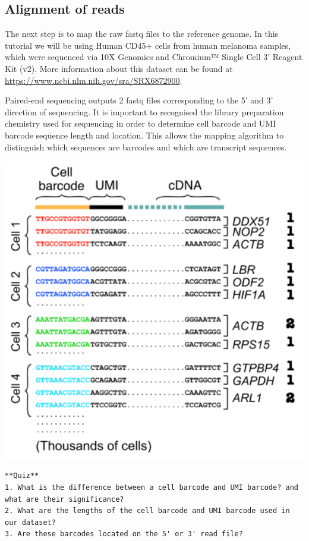 \documentclass[]{book}
\begin{document}
\hypertarget{alignment-of-reads}{%
\subsection{Alignment of reads}\label{alignment-of-reads}}

The next step is to map the raw fastq files to the reference genome. In this tutorial we will be using Human CD45+ cells from human melanoma samples, which were sequenced via 10X Genomics and Chromium™ Single Cell 3' Reagent Kit (v2). More information about this dataset can be found at \url{https://www.ncbi.nlm.nih.gov/sra/SRX6872900}.

Paired-end sequencing outputs 2 fastq files corresponding to the 5' and 3' direction of sequencing. It is important to recognised the library preparation chemistry used for sequencing in order to determine cell barcode and UMI barcode sequence length and location. This allows the mapping algorithm to distinguish which sequences are barcodes and which are transcript sequences.

\includegraphics[width=8.56in]{_book/10X_files/figure-html/barcode}

\begin{verbatim}
**Quiz**
1. What is the difference between a cell barcode and UMI barcode? and what are their significance?
2. What are the lengths of the cell barcode and UMI barcode used in our dataset?
3. Are these barcodes located on the 5' or 3' read file?
\end{verbatim}
\end{document}
